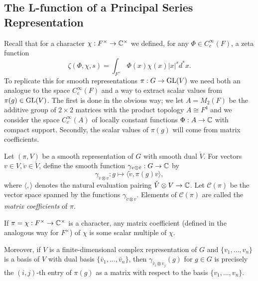 \subsection{The L-function of a Principal Series Representation}\label{sec:LfuncGL2}

Recall that for a character $\chi:F^\times \to \mathbb{C}^\times$ we defined, for any $\Phi \in C_c^\infty(F)$, a zeta function $$\zeta(\Phi,\chi,s) = \int_{F^\times} \Phi(x)\chi(x) |x|^s d^*x.$$
To replicate this for smooth representations $\pi : G \to \mathrm{GL}(V)$ we need both an analogue to the space $C_c^\infty(F)$ and a way to extract scalar values from $\pi(g) \in \mathrm{GL}(V)$. The first is done in the obvious way; we let $A=M_2(F)$ be the additive group of $2\times2$ matrices with the product topology $A\cong F^4$ and we consider the space $C_c^\infty(A)$ of locally constant functions $\Phi:A\to\mathbb{C}$ with compact support. Secondly, the scalar values of $\pi(g)$ will come from matrix coefficients.

\begin{defn}
Let $(\pi,V)$ be a smooth representation of $G$ with smooth dual $\check{V}$. For vectors $v\in V, \check{v} \in \check{V}$, define the smooth function $\gamma_{v \otimes \check{v}}: G \to \mathbb{C}$ by 
$$\gamma_{\check{v} \otimes v} : g \mapsto \langle \check{v},\pi(g) v \rangle,$$ where $\langle, \rangle$ denotes the natural evaluation pairing $\check{V} \otimes V \to \mathbb{C}$. Let $\mathcal C(\pi)$ be the vector space spanned by the functions $\gamma_{\check{v} \otimes v}$. Elements of $\mathcal C(\pi)$ are called the \textit{matrix coefficients} of $\pi$.
\end{defn}
\begin{rem}
    If $\pi=\chi:F^\times \to \mathbb{C}^\times$ is a character, any matrix coefficient (defined in the analogous way for $F^\times$) of $\chi$ is some scalar multiple of $\chi$.

    Moreover, if $V$ is a finite-dimensional complex representation of $G$ and $\{v_1,\ldots,v_n\}$ is a basis of $V$ with dual basis $\{\check{v_1},\ldots,\check{v_n}\}$, then $\gamma_{\check{v_i}\otimes v_j}(g)$ for $g\in G$ is precisely the $(i,j)$-th entry of $\pi(g)$ as a matrix with respect to the basis $\{v_1,\ldots,v_n\}$.
\end{rem}

\iffalse
\begin{defn}
    Let $(\pi,V)$ be an irreducible smooth representation of $G$. The centre $Z$ of $G$ acts on $V$ via the central character $\omega_\pi : Z \to \CC^\times$.
\end{defn}
\fi

